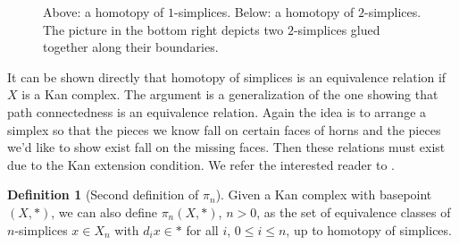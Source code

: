 \documentclass[12pt]{article}
\theoremstyle{plain}
\theoremstyle{definition}
\newtheorem{definition}[theorem]{Definition}
\begin{document}
\begin{figure}[!htp]
\begin{center}
\end{center}
\caption{Above: a homotopy of $1$-simplices. Below: a homotopy of $2$-simplices. The picture in the bottom right depicts two $2$-simplices glued together along their boundaries.}\label{F: fig23}
\end{figure}

It can be shown directly that homotopy of simplices is an equivalence relation if $X$ is  a Kan complex. The argument is a generalization of the one showing that path connectedness is an equivalence relation. Again the idea is to arrange a simplex so that the pieces we know fall on certain faces of horns and the pieces we'd like to show exist  fall on the missing faces. Then these relations must exist due to the Kan extension condition.
We refer the interested reader to \cite[Section I.3]{MAY67}.




\begin{definition}[Second definition of $\pi_n$]\label{D: pin2}
Given a Kan complex  with basepoint $(X,*)$, we can also define $\pi_n(X,*)$, $n>0$, as the set of equivalence classes of $n$-simplices $x\in X_n$ with $d_ix\in *$ for all $i$, $0\leq i\leq n$, up to homotopy of simplices. 
\end{definition}
\end{document}
